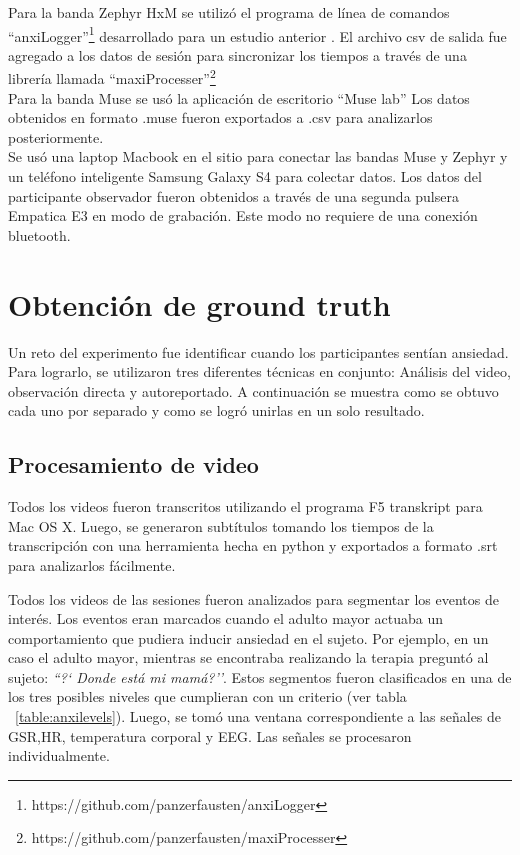 Para la banda Zephyr HxM se utiliz\'o el programa de l\'inea de comandos ``anxiLogger''\footnote{https://github.com/panzerfausten/anxiLogger} desarrollado para un estudio anterior \citep{Miranda}. El archivo csv de salida fue agregado a los datos de sesi\'on para sincronizar los tiempos a trav\'es de una librer\'ia llamada ``maxiProcesser''\footnote{https://github.com/panzerfausten/maxiProcesser}
\\
Para la banda Muse se us\'o la aplicaci\'on de escritorio ``Muse lab'' Los datos obtenidos en formato .muse fueron exportados a .csv para analizarlos posteriormente.
\\
Se us\'o una laptop Macbook en el sitio para conectar las bandas Muse y Zephyr y un tel\'efono inteligente Samsung Galaxy S4 para colectar datos. Los datos del participante observador fueron obtenidos a trav\'es de una segunda pulsera Empatica E3 en modo de grabaci\'on. Este modo no requiere de una conexi\'on bluetooth.

\section{Obtenci\'on de ground truth}\label{secc:dataanalysis}
	Un reto del experimento fue identificar cuando los participantes sent\'ian ansiedad. Para lograrlo, se utilizaron tres diferentes t\'ecnicas en conjunto: An\'alisis del video, observaci\'on directa y autoreportado. A continuaci\'on se muestra como se obtuvo cada uno por separado y como se logr\'o unirlas en un solo resultado.
	\subsection{Procesamiento de video}\label{secc:videoprocesing}
	Todos los videos fueron transcritos utilizando el programa F5 transkript para Mac OS X. Luego, se generaron subt\'itulos tomando los tiempos de la transcripci\'on con una herramienta hecha en python y exportados a formato .srt para analizarlos f\'acilmente.
	
	Todos los videos de las sesiones fueron analizados para segmentar los eventos de inter\'es. Los eventos eran marcados cuando el adulto mayor actuaba un comportamiento que pudiera inducir ansiedad en el sujeto. Por ejemplo, en un caso el adulto mayor, mientras se encontraba realizando la terapia pregunt\'o al sujeto: \textit{``?` Donde est\'a mi mam\'a?''}. Estos segmentos fueron clasificados en una de los tres posibles niveles que cumplieran con un criterio (ver tabla ~\ref{table:anxilevels}). Luego, se tom\'o una ventana correspondiente a las se\~nales de GSR,HR, temperatura corporal y EEG. Las se\~nales se procesaron individualmente.

